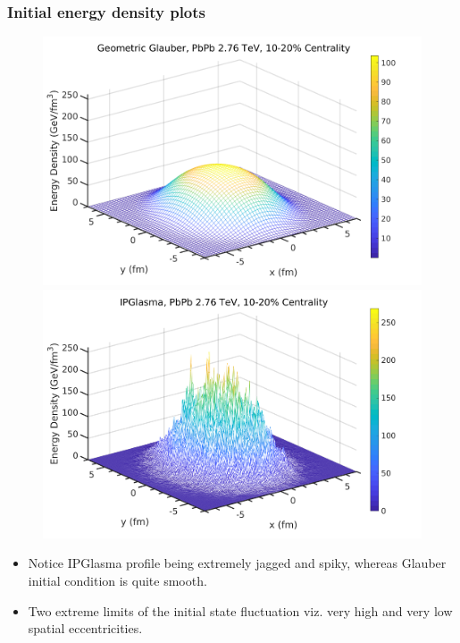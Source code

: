 \documentclass[aspectratio=1610]{beamer}
\begin{document}
\begin{frame}

\frametitle{Initial energy density plots}

\begin{figure}
\includegraphics[scale=0.28]{figs/3DGeometric.png}
\includegraphics[scale=0.28]{figs/IPGlasma.png}
\end{figure}

\begin{itemize}
\item Notice IPGlasma profile being extremely jagged and spiky, whereas Glauber initial condition is quite smooth. 

\item Two extreme limits of the initial state fluctuation viz. very high and very low spatial eccentricities.

\end{itemize}
\end{frame}
\end{document}
